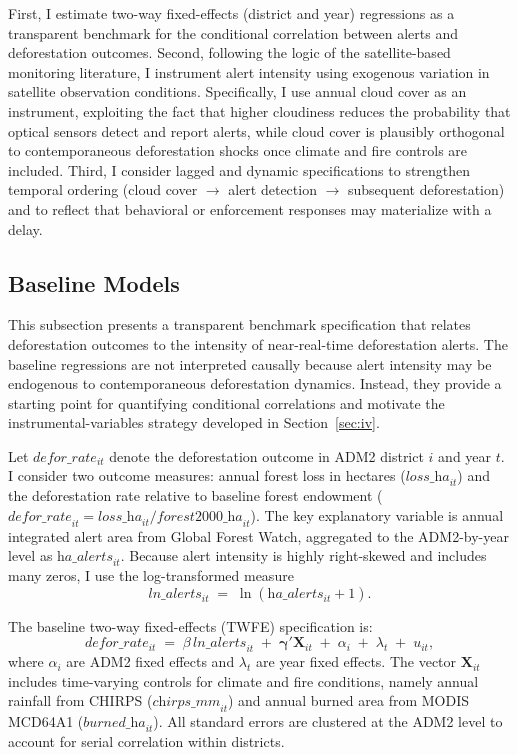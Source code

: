 \documentclass[hidelinks,12pt]{article}
\begin{document}
First, I estimate two-way fixed-effects (district and year) regressions as a transparent benchmark for the conditional correlation between alerts and deforestation outcomes. Second, following the logic of the satellite-based monitoring literature, I instrument alert intensity using exogenous variation in satellite observation conditions. Specifically, I use annual cloud cover as an instrument, exploiting the fact that higher cloudiness reduces the probability that optical sensors detect and report alerts, while cloud cover is plausibly orthogonal to contemporaneous deforestation shocks once climate and fire controls are included. Third, I consider lagged and dynamic specifications to strengthen temporal ordering (cloud cover $\rightarrow$ alert detection $\rightarrow$ subsequent deforestation) and to reflect that behavioral or enforcement responses may materialize with a delay.

\subsection{Baseline Models}
\label{sec:baseline_models}

This subsection presents a transparent benchmark specification that relates deforestation outcomes to the intensity of near-real-time deforestation alerts. The baseline regressions are not interpreted causally because alert intensity may be endogenous to contemporaneous deforestation dynamics. Instead, they provide a starting point for quantifying conditional correlations and motivate the instrumental-variables strategy developed in Section~\ref{sec:iv}.

Let $defor\_rate_{it}$ denote the deforestation outcome in ADM2 district $i$ and year $t$. I consider two outcome measures: annual forest loss in hectares ($\textit{loss\_ha}_{it}$) and the deforestation rate relative to baseline forest endowment ($\textit{defor\_rate}_{it} = \textit{loss\_ha}_{it} / \textit{forest2000\_ha}_{it}$). The key explanatory variable is annual integrated alert area from Global Forest Watch, aggregated to the ADM2-by-year level as $\textit{ha\_alerts}_{it}$. Because alert intensity is highly right-skewed and includes many zeros, I use the log-transformed measure
\begin{equation}
  \textit{ln\_alerts}_{it} \;=\; \ln\!\left(\textit{ha\_alerts}_{it}+1\right).
\end{equation}

The baseline two-way fixed-effects (TWFE) specification is:
\begin{equation}
\label{eq:baseline_fe}
  defor\_rate_{it}
  \;=\;
  \beta\,\textit{ln\_alerts}_{it}
  \;+\;
  \boldsymbol{\gamma}'\mathbf{X}_{it}
  \;+\;
  \alpha_i
  \;+\;
  \lambda_t
  \;+\;
  u_{it},
\end{equation}
where $\alpha_i$ are ADM2 fixed effects and $\lambda_t$ are year fixed effects. The vector $\mathbf{X}_{it}$ includes time-varying controls for climate and fire conditions, namely annual rainfall from CHIRPS ($\textit{chirps\_mm}_{it}$) and annual burned area from MODIS MCD64A1 ($\textit{burned\_ha}_{it}$). All standard errors are clustered at the ADM2 level to account for serial correlation within districts.
\end{document}

